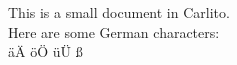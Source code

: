 \documentclass{article}
\begin{document}
This is a small document in Carlito.
\\
Here are some German characters:
\\
äÄ öÖ üÜ ß
\end{document}
